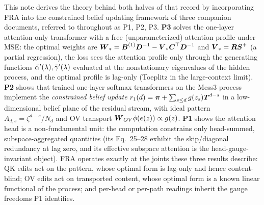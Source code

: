 \documentclass{article}
\begin{document}
This note derives the theory behind both halves of that record by incorporating FRA into the constrained belief updating framework of three companion documents, referred to throughout as P1, P2, P3. \textbf{P3} solves the one-layer attention-only transformer with a free (unparameterized) attention profile under MSE: the optimal weights are $\boldsymbol{W}_* = \boldsymbol{B}^{(1)}\boldsymbol{D}^{-1} - \boldsymbol{V}_*\boldsymbol{C}^\top\boldsymbol{D}^{-1}$ and $\boldsymbol{V}_* = \boldsymbol{R}\boldsymbol{S}^+$ (a partial regression), the loss sees the attention profile only through the generating functions $\Tilde{\alpha}'(\lambda), \Tilde{\gamma}'(\lambda)$ evaluated at the nonstationary eigenvalues of the hidden process, and the optimal profile is lag-only (Toeplitz in the large-context limit). \textbf{P2} shows that trained one-layer softmax transformers on the Mess3 process implement the \emph{constrained belief update} $r_1(d) = \boldsymbol{\pi} + \sum_{s\le d} g(z_s)\boldsymbol{T}^{d-s}$ in a low-dimensional belief plane of the residual stream, with ideal pattern $A_{d,s} = \zeta^{d-s}/N_d$ and OV transport $\boldsymbol{W}_{OV}\phi(e(z)) \propto g(z)$. \textbf{P1} shows the attention head is a non-fundamental unit: the computation constrains only head-summed, subspace-aggregated quantities (its Eq.~25--28 exhibit the skip/diagonal redundancy at lag zero, and its effective subspace attention is the head-gauge-invariant object). FRA operates exactly at the joints these three results describe: QK edits act on the pattern, whose optimal form is lag-only and hence content-blind; OV edits act on transported content, whose optimal form is a known linear functional of the process; and per-head or per-path readings inherit the gauge freedoms P1 identifies.
\end{document}
